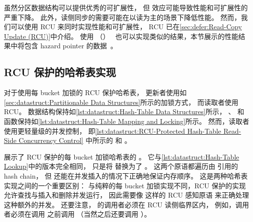 虽然分区数据结构可以提供优秀的可扩展性，
但  效应可能导致性能和可扩展性的严重下降。
此外，读侧同步的需要可能在以读为主的场景下降低性能。
然而，我们可以使用 RCU 来同时实现性能和可扩展性，
RCU 已在\cref{sec:defer:Read-Copy Update (RCU)}中介绍。
使用 （）~\cite{MagedMichael04a}
也可以实现类似的结果，本节展示的性能结果中将包含
hazard pointer 的数据~\cite{McKenney:2013:SDS:2483852.2483867}。

\subsection{RCU 保护的哈希表实现}
\label{sec:datastruct:RCU-Protected Hash Table Implementation}

对于使用每 bucket 加锁的 RCU 保护哈希表，
更新者使用如\cref{sec:datastruct:Partitionable Data Structures}所示的加锁方式，
而读取者使用 RCU\@。
数据结构保持如\cref{lst:datastruct:Hash-Table Data Structures}所示，
、 和 
函数保持如\cref{lst:datastruct:Hash-Table Mapping and Locking}所示。
然而，读取者使用更轻量级的并发控制，
即\cref{lst:datastruct:RCU-Protected Hash-Table Read-Side Concurrency Control}
中所示的  和 。

\begin{listing}

\caption{RCU 保护的 Hash-Table 读侧并发控制}
\label{lst:datastruct:RCU-Protected Hash-Table Read-Side Concurrency Control}
\end{listing}

展示了 RCU 保护的每 bucket 加锁哈希表的 。
它与\cref{lst:datastruct:Hash-Table Lookup}中的版本完全相同，
只是将  替换为了
。
这两个原语都遍历由  引用的 hash chain，
但  还能在并发插入的情况下正确地保证内存顺序。
这是两种哈希表实现之间的一个重要区别：
与纯粹的每 bucket 加锁实现不同，RCU 保护的实现允许查找与插入和删除并发运行，
因此需要像  这样的 RCU 感知原语
来正确处理这种额外的并发。
还要注意， 的调用者必须在 RCU 读侧临界区内，
例如，调用者必须在调用  之前调用
（当然之后还要调用 ）。

\begin{listing}

\caption{RCU 保护的 Hash-Table 查找}
\label{lst:datastruct:RCU-Protected Hash-Table Lookup}
\end{listing}

